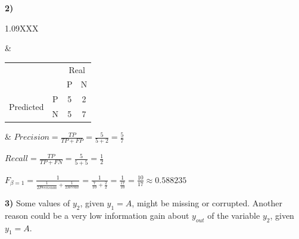 \documentclass[11pt,a4paper]{article}
\begin{document}
\begin{flushleft}
\textbf{2)}
\small
\hspace{-8.25mm}
\vspace{4mm}
\begin{tabularx}{1.09\textwidth}{XXX}
  
  \begin{tikzpicture}[node/.style={draw,rectangle}, ->]
    \node [node] (node_1) {$y_1$};
    \path (node_1) ++ (-135:2) node [node] (node_2) {P (5/7)};
    \path (node_1) ++ (-45:2) node [node] (node_3) {N (7/13)};
    \draw (node_1) -- (node_2) node [left,pos=0.25] {A\hspace{2mm} }(node_1);
    \draw (node_1) -- (node_3) node [right,pos=0.25] {\hspace{2mm}B}(node_1);
  \end{tikzpicture} &

  \begin{tabular}{llcc}
    &                        & \multicolumn{2}{c}{Real}                        \\ \cline{3-4} 
    & \multicolumn{1}{l|}{}  & \multicolumn{1}{c|}{P} & \multicolumn{1}{c|}{N} \\ \cline{2-4} 
  \multicolumn{1}{c|}{\multirow{2}{*}{Predicted}} & \multicolumn{1}{c|}{P} & \multicolumn{1}{c|}{5} & \multicolumn{1}{c|}{2} \\ \cline{2-4} 
  \multicolumn{1}{c|}{}                           & \multicolumn{1}{c|}{N} & \multicolumn{1}{c|}{5} & \multicolumn{1}{c|}{7} \\ \cline{2-4} 
  \end{tabular} &
  \normalsize
  $ Precision = \frac{TP}{TP + FP} = \frac{5}{5 + 2} = \frac{5}{7} $ \par
  $ Recall = \frac{TP}{TP + FN} = \frac{5}{5 + 5} = \frac{1}{2} $
\end{tabularx}
\vspace{0mm}
\normalsize
$ F_{\beta = 1} = \frac{1}{\frac{1}{2Precision} + \frac{1}{2Recall}} = \frac{1}{\frac{7}{10} + \frac{2}{2}} = \frac{1}{\frac{17}{10}} = \frac{10}{17} \approx 0.588235 $ \par
\end{flushleft}
\vfill

\begin{flushleft}
\textbf{3)}
Some values of $y_2$, given $y_1 = A$, might be missing or corrupted. Another reason could be a very low information gain about $y_{out}$ of the variable $y_2$, given $y_1 = A$.
\end{flushleft}
\vfill
\end{document}
